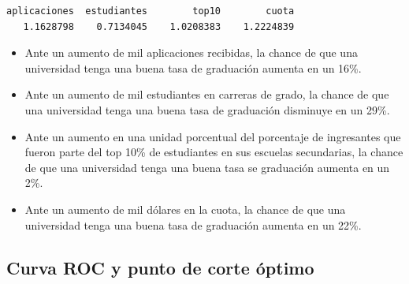 \documentclass[
  letterpaper,
  DIV=11,
  numbers=noendperiod]{scrartcl}
\newenvironment{Shaded}{\begin{snugshade}}{\end{snugshade}}
\newcommand{\AttributeTok}[1]{\textcolor[rgb]{0.40,0.45,0.13}{#1}}
\newcommand{\ConstantTok}[1]{\textcolor[rgb]{0.56,0.35,0.01}{#1}}
\newcommand{\DecValTok}[1]{\textcolor[rgb]{0.68,0.00,0.00}{#1}}
\newcommand{\FunctionTok}[1]{\textcolor[rgb]{0.28,0.35,0.67}{#1}}
\newcommand{\NormalTok}[1]{\textcolor[rgb]{0.00,0.23,0.31}{#1}}
\newcommand{\OtherTok}[1]{\textcolor[rgb]{0.00,0.23,0.31}{#1}}
\newcommand{\SpecialCharTok}[1]{\textcolor[rgb]{0.37,0.37,0.37}{#1}}
\providecommand{\tightlist}{%
  \setlength{\itemsep}{0pt}\setlength{\parskip}{0pt}}\usepackage{longtable,booktabs,array}
\begin{document}
\begin{Shaded}
\end{Shaded}

\begin{verbatim}
aplicaciones  estudiantes        top10        cuota 
   1.1628798    0.7134045    1.0208383    1.2224839 
\end{verbatim}

\begin{itemize}
\tightlist
\item
  Ante un aumento de mil aplicaciones recibidas, la chance de que una
  universidad tenga una buena tasa de graduación aumenta en un 16\%.
\item
  Ante un aumento de mil estudiantes en carreras de grado, la chance de
  que una universidad tenga una buena tasa de graduación disminuye en un
  29\%.
\item
  Ante un aumento en una unidad porcentual del porcentaje de ingresantes
  que fueron parte del top 10\% de estudiantes en sus escuelas
  secundarias, la chance de que una universidad tenga una buena tasa se
  graduación aumenta en un 2\%.
\item
  Ante un aumento de mil dólares en la cuota, la chance de que una
  universidad tenga una buena tasa de graduación aumenta en un 22\%.
\end{itemize}

\hypertarget{curva-roc-y-punto-de-corte-uxf3ptimo}{%
\subsection{Curva ROC y punto de corte
óptimo}\label{curva-roc-y-punto-de-corte-uxf3ptimo}}

\begin{Shaded}
\end{Shaded}
\end{document}
